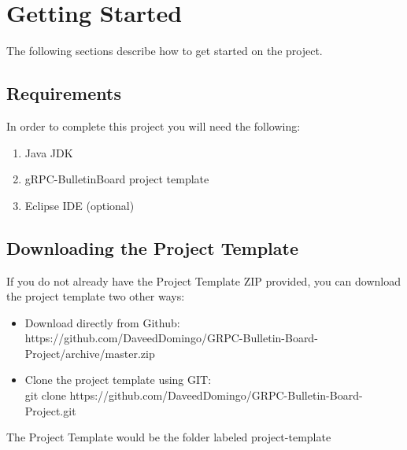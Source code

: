 \documentclass{article}
\begin{document}
\section{Getting Started} %
The following sections describe how to get started on the project. 

\subsection{Requirements}
In order to complete this project you will need the following:
\begin{enumerate}
\item Java JDK
\item gRPC-BulletinBoard project template
\item Eclipse IDE (optional)
\end{enumerate}

\subsection{Downloading the Project Template}
If you do not already have the Project Template ZIP provided, you can download the project template two other ways:
\begin{itemize}
\item Download directly from Github:\\ https://github.com/DaveedDomingo/GRPC-Bulletin-Board-Project/archive/master.zip
\item Clone the project template using GIT:\\ git clone https://github.com/DaveedDomingo/GRPC-Bulletin-Board-Project.git
\end{itemize} 
The Project Template would be the folder labeled project-template
\end{document}
